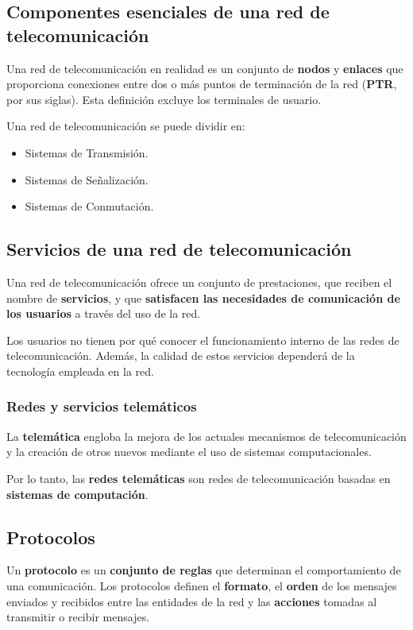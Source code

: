 \documentclass[a4paper]{book}
\begin{document}
\subsection{Componentes esenciales de una red de telecomunicación}
Una red de telecomunicación en realidad es un conjunto de \textbf{nodos} y \textbf{enlaces} que proporciona conexiones entre dos o más puntos de terminación de la red (\textbf{PTR}, por sus siglas). Esta definición excluye los terminales de usuario.

Una red de telecomunicación se puede dividir en:
\begin{itemize}
  \item Sistemas de Transmisión.
  \item Sistemas de Señalización.
  \item Sistemas de Conmutación.
\end{itemize}

\subsection{Servicios de una red de telecomunicación}
Una red de telecomunicación ofrece un conjunto de prestaciones, que reciben el nombre de \textbf{servicios}, y que \textbf{satisfacen las necesidades de comunicación de los usuarios} a través del uso de la red.

Los usuarios no tienen por qué conocer el funcionamiento interno de las redes de telecomunicación. Además, la calidad de estos servicios dependerá de la tecnología empleada en la red.

\subsubsection{Redes y servicios telemáticos}
La \textbf{telemática} engloba la mejora de los actuales mecanismos de telecomunicación y la creación de otros nuevos mediante el uso de sistemas computacionales.

Por lo tanto, las \textbf{redes telemáticas} son redes de telecomunicación basadas en \textbf{sistemas de computación}.

\subsection{Protocolos}
Un \textbf{protocolo} es un \textbf{conjunto de reglas} que determinan el comportamiento de una comunicación. Los protocolos definen el \textbf{formato}, el \textbf{orden} de los mensajes enviados y recibidos entre las entidades de la red y las \textbf{acciones} tomadas al transmitir o recibir mensajes.
\end{document}

